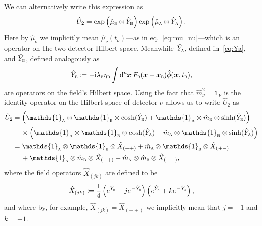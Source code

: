 \documentclass[pra,nofootinbib,floats,aps,twocolumn,tightenlines,superscriptaddress]{revtex4-1}
\renewcommand*\d[2][]{%
	\mathrm{d}%
	\ifx\relax#1\relax\else
	\rule{-0.02em}{1.5ex}^{#1}\rule{0.08em}{0ex}\!
	\fi
	#2\,
}
\newcommand{\ii}{\mathrm{i}}
\newcommand{\ma}{\hat{m}_\textsc{a}}
\newcommand{\mb}{\hat{m}_\textsc{b}}
\newcommand{\mua}{\hat{\mu}_\textsc{a}}
\newcommand{\mub}{\hat{\mu}_\textsc{b}}
\newcommand{\Ya}{\hat{Y}_\textsc{a}}
\newcommand{\Yb}{\hat{Y}_\textsc{b}}
\begin{document}
We can alternatively write this expression as
\begin{equation}
    \hat{U}_2
    =
    \exp
    \left(
    \mub
    \otimes
    \Yb
    \right)
    \exp
    \left(
    \mua
    \otimes
    \Ya
    \right).
\end{equation}
Here by $\hat{\mu}_\nu$ we implicitly mean $\hat{\mu}_\nu(t_\nu)$---as in eq.~\eqref{eq:mu_nu}---which is an operator on the two-detector Hilbert space. Meanwhile $\Ya$, defined in~\eqref{eq:Ya}, and $\Yb$, defined analogously as
\begin{equation}
\label{eq:Yb}
    \hat{Y}_\textsc{b}
    \coloneqq
    -\ii \lambda_\textsc{b}
    \eta_\textsc{b}
    \int\d[n]{\bm x}
    F_\textsc{b}(\bm{x}-\bm{x}_\textsc{b})
    \hat{\phi}(\bm{x},t_\textsc{b}),
\end{equation}
are operators on the field's Hilbert space. Using the fact that $\hat{m}_\nu^2=\mathds{1}_\nu$ is the identity operator on the Hilbert space of detector $\nu$ allows us to write $\hat{U}_2$ as
\begin{align}
\label{eq:U2_v2}
    \hat{U}_2
    &=
    \left(
    \mathds{1}_\textsc{a}
    \otimes
    \mathds{1}_\textsc{b}
    \otimes
    \cosh(\Yb)
    +
    \mathds{1}_\textsc{a}
    \otimes
    \mb
    \otimes
    \sinh(\Yb)
    \right)
    \notag\\
    &\hspace{1.2em}\times
    \left(
    \mathds{1}_\textsc{a}
    \otimes
    \mathds{1}_\textsc{b}
    \otimes
    \cosh(\Ya)
    +
    \ma
    \otimes
    \mathds{1}_\textsc{b}
    \otimes
    \sinh(\Ya)
    \right)
    \notag\\
    &=
    \mathds{1}_\textsc{a}
    \otimes
    \mathds{1}_\textsc{b}
    \otimes
    \hat{X}_{(++)}
    +
    \ma
    \otimes
    \mathds{1}_\textsc{b}
    \otimes
    \hat{X}_{(+-)}
    \notag\\
    &\hspace{1.2em}
    +
    \mathds{1}_\textsc{a}
    \otimes
    \mb
    \otimes
    \hat{X}_{(-+)}
    +
    \ma
    \otimes
    \mb
    \otimes
    \hat{X}_{(--)},
\end{align}
where the field operators $\hat{X}_{(jk)}$ are defined to be
\begin{equation}
\label{eq:X_jk}
    \hat{X}_{(jk)}
    \coloneqq
    \frac{1}{4}
    \left(
    e^{\Yb}+j e^{-\Yb}
    \right)
    \left(
    e^{\Ya}+k e^{-\Ya}
    \right),
\end{equation}
and where by, for example, $\hat{X}_{(jk)}=\hat{X}_{(-+)}$ we implicitly mean that $j=-1$ and $k=+1$.
\end{document}
